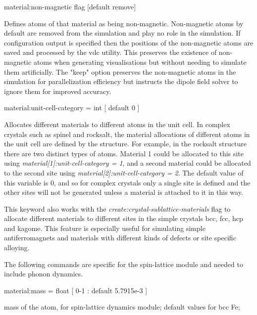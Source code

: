 {\zicf material:non-magnetic flag [default remove]} Defines atoms of
that material as being non-magnetic. Non-magnetic atoms by default are removed from the simulation and play no role in the simulation. If configuration output is specified then the positions of the non-magnetic atoms are saved and processed by the vdc utility. This preserves the existence of non-magnetic atoms when generating visualisations but without needing to simulate them artificially. The "keep" option preserves the non-magnetic atoms in the simulation for parallelization efficiency but instructs the dipole field solver to ignore them for improved accuracy.


{\zicf material:unit-cell-category = int [ default 0 ]} Allocates different materials to different atoms in the unit cell. In complex crystals such as spinel and rocksalt, the material allocations of
different atoms in the unit cell are defined by the structure. For example, in the rocksalt structure there are two distinct types of atoms. Material 1 could be allocated to this site using \textit{material[1]:unit-cell-category = 1}, and a second material could be allocated to the second site using
\textit{material[2]:unit-cell-category = 2}. The default value of this variable is 0, and so for complex crystals only a single site is defined and the other sites will not be generated unless a material is attached to it in this way.

This keyword also works with the \textit{create:crystal-sublattice-materials} flag to allocate different materials to different sites in the simple crystals bcc, fcc, hcp and kagome. This feature is especially useful for simulating simple antiferromagnets and materials with different kinds of defects or site specific alloying.

The following commands are specific for the spin-lattice module and needed to include phonon dynamics.

{\zicf material:mass = float [ 0-1 : default 5.7915e-3 ]} mass of the atom, for spin-lattice dynamics module; default values for bcc Fe;


